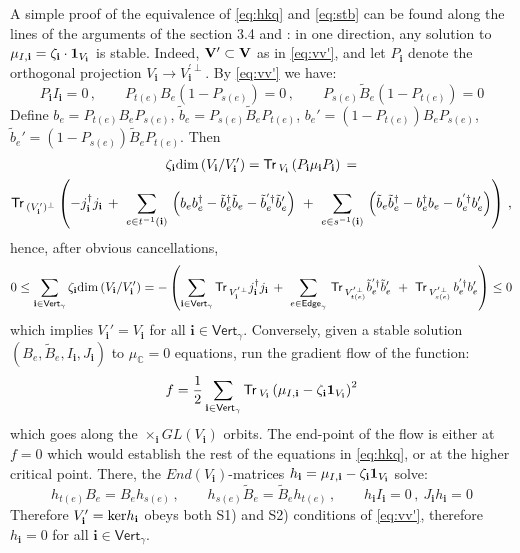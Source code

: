\documentclass[12pt]{amsart}
\newcommand {\3}{\underline{\bf 3}}
\newcommand {\4}{\underline{\bf 4}}
\newcommand {\6}{\underline{\bf 6}}
\newcommand{\beq}{\begin{equation}}
\newcommand{\eeq}{\end{equation}}
\newcommand {\BC}   {\mathbb C}
\newcommand {\ib} {\mathbf{i}}
\newcommand{\Vg}{\mathsf{Vert}_{\gamma}}
\newcommand{\Eg}{\mathsf{Edge}_{\gamma}}
\newcommand{\Tr}{\mathsf{Tr}\,}
\begin{document}
A simple proof of the equivalence of \eqref{eq:hkq} and \eqref{eq:stb} can be found along the lines of the arguments of the section 3.4 and \cite{Nekrasov:2016qym}: in one direction, 
any solution to ${\mu}_{I, \ib} = {\zeta}_{\ib} \cdot {\bf 1}_{V_{\ib}}$ is stable. Indeed, ${\bf V}' \subset {\bf V}$ as in \eqref{eq:vv'}, and let $P_{\ib}$ denote the orthogonal projection $V_{\ib} \to V_{\ib}^{'\perp}$. By \eqref{eq:vv'} we have:
\beq
P_{\ib} I_{\ib} = 0 \, , \qquad P_{t(e)} B_{e} (1-P_{s(e)}) = 0 \, ,  \qquad P_{s(e)} {\tilde B}_{e} (1-P_{t(e)}) = 0 \eeq
Define $b_{e} = P_{t(e)}B_{e}P_{s(e)}$, ${\tilde b}_{e} = P_{s(e)}{\tilde B}_{e} P_{t(e)}$, 
$b_{e}'= (1-P_{t(e)})B_{e}P_{s(e)}$, ${\tilde b}_{e}'= (1-P_{s(e)}){\tilde B}_{e}P_{t(e)}$. 
Then 
\begin{multline}
{\zeta}_{\ib} {\rm dim}\left( V_{\ib}/V_{\ib}' \right) = {\Tr}_{V_{\ib}} \left( P_{\ib} {\mu}_{\ib} P_{\ib} \right) \, = \\
{\Tr}_{(V_{\ib}')^{\perp}} \left( - j_{\ib}^{\dagger} j_{\ib}  \, + \ \sum_{e \in t^{-1}({\ib})} \, \left( b_{e} b_{e}^{\dagger}  - {\tilde b}_{e}^{\dagger} {\tilde b}_{e} - {\tilde b}_{e}^{'\dagger} {\tilde b}'_{e}\right) \ + \ \sum_{e \in s^{-1}({\ib})}\, \left(  {\tilde b}_{e} {\tilde b}_{e}^{\dagger} - b_{e}^{\dagger} b_{e}  - b_{e}^{'\dagger}b'_{e}
\right) \right) \, ,
\end{multline}
hence, after obvious cancellations,
\beq
0 \leq \sum_{{\ib} \in \Vg} {\zeta}_{\ib} {\rm dim}\left( V_{\ib}/V_{\ib}' \right) = - \left( \sum_{\ib \in \Vg} {\Tr}_{V_{\ib}^{'\perp}}  j_{\ib}^{\dagger} j_{\ib}  \, + \ \sum_{e \in \Eg} \, {\Tr}_{V_{t(e)}^{'\perp}}  {\tilde b}_{e}^{'\dagger} {\tilde b}'_{e} \ + \ {\Tr}_{V_{s(e)}^{'\perp}}\,  b_{e}^{'\dagger}b'_{e}
 \right) \leq 0
\eeq 
which implies $V_{\ib}' = V_{\ib}$ for all $\ib \in \Vg$. 
Conversely, given a stable solution $(B_{e}, {\tilde B}_{e}, I_{\ib}, J_{\ib})$ to ${\mu}_{\BC} = 0$ equations, run the gradient flow of the function:
\beq
f = \frac 12 \sum_{\ib \in \Vg} {\Tr}_{V_{\ib}} \left( {\mu}_{I, \ib} - {\zeta}_{\ib} {\bf 1}_{V_{\ib}} \right)^{2}
\eeq
which goes along the $\times_{\ib} GL(V_{\ib})$ orbits. The end-point of the flow is either at $f = 0$ which would establish the rest of the equations in \eqref{eq:hkq}, or at the higher critical point. There, the $End(V_{\ib})$-matrices $h_{\ib} = {\mu}_{I,{\ib}} - {\zeta}_{\ib} {\bf 1}_{V_{\ib}}$ solve:
\beq
h_{t(e)}B_{e} = B_{e} h_{s(e)}\, , \qquad h_{s(e)}{\tilde B}_{e} = {\tilde B}_{e} h_{t(e)}\, , \qquad
 h_{\ib} I_{\ib} = 0 \, , \ J_{\ib} h_{\ib} = 0 
 \label{eq:hbij}
 \eeq
Therefore $V_{\ib}' = {\rm ker}h_{\ib}$ obeys both S1) and S2) conditions of \eqref{eq:vv'}, therefore $h_{\ib} =0$ for all $\ib \in \Vg$. 
\end{document}
